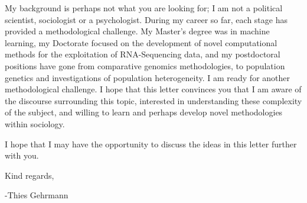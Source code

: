 \documentclass[letterpaper, 10pt]{article} %
\begin{document}
\begin{tcolorbox}[
	blanker,
	width=0.90\textwidth,
	enlarge left by=0.05\textwidth,
	enlarge right by=0.05\textwidth,
	before skip=6pt,
	breakable]
My background is perhaps not what you are looking for; I am not a political scientist, sociologist or a psychologist.
During my career so far, each stage has provided a methodological challenge.
My Master’s degree was in machine learning, my Doctorate focused on the development of novel computational methods for the exploitation of RNA-Sequencing data, and my postdoctoral positions have gone from comparative genomics methodologies, to population genetics and investigations of population heterogeneity.
I am ready for another methodological challenge.
I hope that this letter convinces you that I am aware of the discourse surrounding this topic, interested in understanding these complexity of the subject, and willing to learn and perhaps develop novel methodologies within sociology.

I hope that I may have the opportunity to discuss the ideas in this letter further with you.

Kind regards,

-Thies Gehrmann

\end{tcolorbox}



\thispagestyle{empty}
\end{document}

